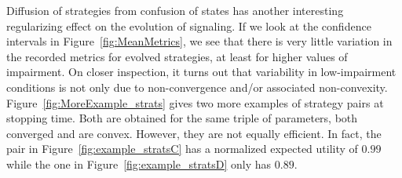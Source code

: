 Diffusion of strategies from confusion of states has another
interesting regularizing effect on the evolution of signaling. If we
look at the confidence intervals in Figure~\ref{fig:MeanMetrics}, we
see that there is very little variation in the recorded metrics for
evolved strategies, at least for higher values of impairment. On
closer inspection, it turns out that variability in low-impairment
conditions is not only due to non-convergence and/or associated
non-convexity. Figure~\ref{fig:MoreExample_strats} gives two more
examples of strategy pairs at stopping time. Both are obtained for the
same triple of parameters, both converged and are convex. However,
they are not equally efficient. In fact, the pair in
Figure~\ref{fig:example_stratsC} has a normalized expected utility of
$0.99$ while the one in Figure~\ref{fig:example_stratsD} only has
$0.89$.


